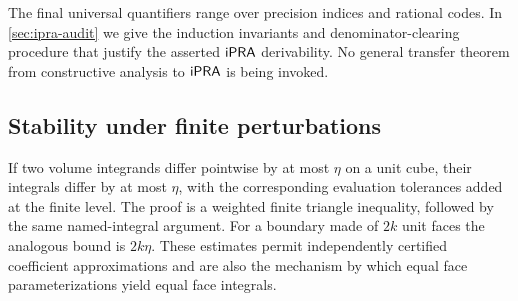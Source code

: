 The final universal quantifiers range over precision indices and rational
codes. In \cref{sec:ipra-audit} we give the induction invariants and
denominator-clearing procedure that justify the asserted $\mathsf{iPRA}$
derivability. No general transfer theorem from constructive analysis to
$\mathsf{iPRA}$ is being invoked.

\subsection{Stability under finite perturbations}

If two volume integrands differ pointwise by at most $\eta$ on a unit
cube, their integrals differ by at most $\eta$, with the corresponding
evaluation tolerances added at the finite level. The proof is a weighted
finite triangle inequality, followed by the same named-integral argument.
For a boundary made of $2k$ unit faces the analogous bound is $2k\eta$.
These estimates permit independently certified coefficient approximations
and are also the mechanism by which equal face parameterizations yield
equal face integrals.
